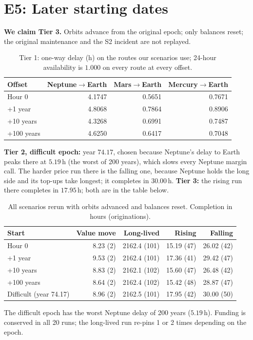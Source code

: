 \documentclass[11pt]{article}
\theoremstyle{definition}
\theoremstyle{remark}
\newcommand{\h}{\,\mathrm{h}}
\begin{document}
\section{E5: Later starting dates}\label{app:e5}
\textbf{We claim Tier 3.} Orbits advance from the original epoch; only balances reset; the original maintenance and the S2 incident are not replayed.
\begin{table}[H]
\centering
\caption{Tier 1: one-way delay (h) on the routes our scenarios use; 24-hour availability is $1.000$ on every route at every offset.}
\small
\begin{tabular}{@{}lrrr@{}}
\toprule
Offset & Neptune$\to$Earth & Mars$\to$Earth & Mercury$\to$Earth \\
\midrule
Hour 0 & 4.1747 & 0.5651 & 0.7671 \\
+1 year & 4.8068 & 0.7864 & 0.8906 \\
+10 years & 4.3268 & 0.6991 & 0.7487 \\
+100 years & 4.6250 & 0.6417 & 0.7048 \\
\bottomrule
\end{tabular}
\end{table}
\textbf{Tier 2, difficult epoch:} year $74.17$, chosen because Neptune's delay to Earth peaks there at $5.19\h$ (the worst of 200 years), which slows every Neptune margin call. The harder price run there is the falling one, because Neptune holds the long side and its top-ups take longest; it completes in $30.00\h$. \textbf{Tier 3:} the rising run there completes in $17.95\h$; both are in the table below.
\begin{table}[H]
\centering
\caption{All scenarios rerun with orbits advanced and balances reset. Completion in hours (originations).}
\small
\begin{tabular}{@{}lrrrr@{}}
\toprule
Start & Value move & Long-lived & Rising & Falling \\
\midrule
Hour 0 & 8.23 (2) & 2162.4 (101) & 15.19 (47) & 26.02 (42) \\
+1 year & 9.53 (2) & 2162.4 (101) & 17.36 (41) & 29.42 (47) \\
+10 years & 8.83 (2) & 2162.1 (102) & 15.60 (47) & 26.48 (42) \\
+100 years & 8.64 (2) & 2162.4 (102) & 15.42 (48) & 28.87 (47) \\
Difficult (year 74.17) & 8.96 (2) & 2162.5 (101) & 17.95 (42) & 30.00 (50) \\
\bottomrule
\end{tabular}
\end{table}
The difficult epoch has the worst Neptune delay of 200 years ($5.19\h$). Funding is conserved in all 20 runs; the long-lived run re-pins 1 or 2 times depending on the epoch.
\end{document}
